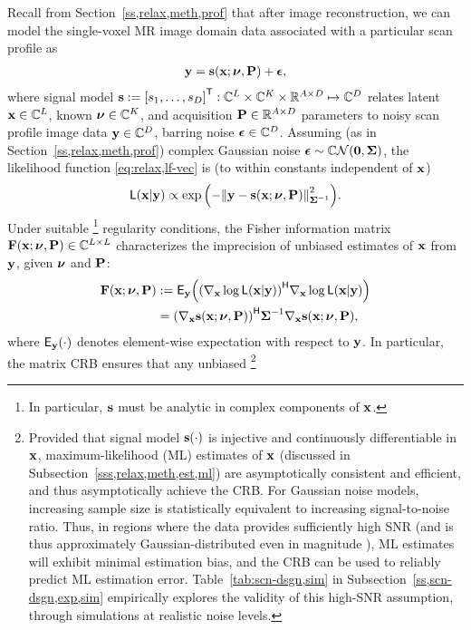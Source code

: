 Recall from Section~\ref{ss,relax,meth,prof}
that after image reconstruction,
we can model the single-voxel MR image domain data
associated with a particular scan profile as 
\begin{align}
	\bmy = \bms\paren{\bmx; \bmnu, \bmP} + \bmeps,
	\label{eq:scn-dsgn,mod-vec-abbrev}
\end{align}
where signal model
$\bms := \brac{s_1, \dots, s_D}\tpose
: \complexes{L} \times \complexes{K} \times \reals{A \times D} \mapsto \complexes{D}$
relates latent $\mathbf{x} \in \mathbb{C}^{L}$,
known $\boldsymbol{\nu} \in \mathbb{C}^{K}$,
and acquisition $\mathbf{P} \in \mathbb{R}^{A \times D}$ parameters
to noisy scan profile image data $\mathbf{y} \in \mathbb{C}^{D}$, 
barring noise $\boldsymbol{\epsilon} \in \mathbb{C}^{D}$.
Assuming (as in Section~\ref{ss,relax,meth,prof})
complex Gaussian noise $\bmeps \sim \cgauss{\mathbf{0}}{\bmSig}$,
the likelihood function \eqref{eq:relax,lf-vec} is
(to within constants independent of $\mathbf{x}$)
\begin{align}
	\Lf{\bmx|\bmy} \propto
		\expa{-\norm{\bmy - \bms\paren{\bmx; \bmnu, \bmP}}^2_{\bmSig^{-1}}}.
	\label{eq:scn-dsgn,lf-vec}
\end{align}
Under suitable
\footnote{%
	In particular,
	$\mathbf{s}$ must be analytic in complex components
	of $\mathbf{x}$.
}
regularity conditions,
the Fisher information matrix 
$\Fisher{\bmx; \bmnu, \bmP} \in \complexes{L \times L}$
\cite{fisher:1925:tos}
characterizes the imprecision 
of unbiased estimates 
of $\mathbf{x}$ from $\mathbf{y}$, 
given $\boldsymbol{\nu}$ and $\mathbf{P}$:
\begin{align}
	\Fisher{\bmx; \bmnu, \bmP} 
		&:= 
		\expect{\bmy}{\paren{\grada{\bmx} \log{\Lf{\bmx|\bmy}}}\ctpose
		\grada{\bmx} \log{\Lf{\bmx|\bmy}}} 
		\nonumber \\
		&= 
		\paren{\grada{\bmx} \bms\paren{\bmx; \bmnu, \bmP}}\ctpose
		\bmSig^{-1} \grada{\bmx} \bms\paren{\bmx; \bmnu, \bmP}
		\label{eq:scn-dsgn,fisher},
\end{align}
where $\expect{\bmy}{\cdot}$ denotes element-wise expectation
with respect to $\mathbf{y}$.
In particular,
the matrix CRB \cite{cramer:46} ensures
that any unbiased
\footnote{%
	Provided that signal model $\bms\paren{\cdot}$
	is injective and continuously differentiable in $\mathbf{x}$, 
	maximum-likelihood (ML) estimates of $\mathbf{x}$
	(discussed in Subsection~\ref{sss,relax,meth,est,ml})
	are asymptotically consistent and efficient,
	and thus asymptotically achieve the CRB.
	For Gaussian noise models,
	increasing sample size is statistically equivalent
	to increasing signal-to-noise ratio. 
	Thus, in regions where the data provides sufficiently high SNR
	(and is thus approximately Gaussian-distributed 
	even in magnitude \cite{gudbjartsson:95:trd}), 
	ML estimates will exhibit minimal estimation bias,
	and the CRB can be used 
	to reliably predict ML estimation error.
	Table~\ref{tab:scn-dsgn,sim} in Subsection~\ref{ss,scn-dsgn,exp,sim}
	empirically explores the validity
	of this high-SNR assumption,
	through simulations
	at realistic noise levels.
}
